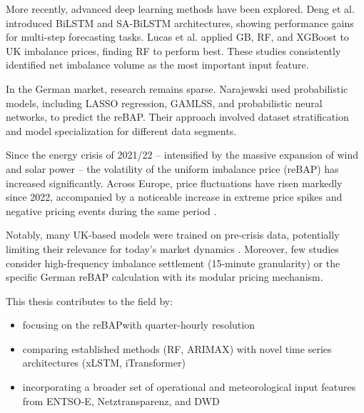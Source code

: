 \documentclass[class=scrbook, crop=false]{standalone}
\begin{document}
More recently, advanced deep learning methods have been explored. Deng et al. \cite{dengSeasonalityDeepLearning2024} introduced BiLSTM and SA-BiLSTM architectures, showing performance gains for multi-step forecasting tasks. Lucas et al. \cite{lucasPriceForecastingBalancing2020} applied \gls{GB}, \gls{RF}, and XGBoost to UK imbalance prices, finding \gls{RF} to perform best. These studies consistently identified net imbalance volume as the most important input feature.

In the German market, research remains sparse. Narajewski \cite{narajewskiProbabilisticForecastingGerman2022} used probabilistic models, including LASSO regression, GAMLSS, and probabilistic neural networks, to predict the reBAP. Their approach involved dataset stratification and model specialization for different data segments.

Since the energy crisis of 2021/22 – intensified by the massive expansion of wind and solar power – the volatility of the uniform imbalance price (reBAP) has increased significantly. Across Europe, price fluctuations have risen markedly since 2022, accompanied by a noticeable increase in extreme price spikes and negative pricing events during the same period \cite{pavlikRenewableEnergyPrice2025}.

Notably, many UK-based models were trained on pre-crisis data, potentially limiting their relevance for today’s market dynamics  \cite{abadieEnergyMarketPrices2021}. Moreover, few studies consider high-frequency imbalance settlement (15-minute granularity) or the specific German reBAP calculation with its modular pricing mechanism.

This thesis contributes to the field by:
\begin{itemize}
\item focusing on the \gls{reBAP}with quarter-hourly resolution
\item comparing established methods (\gls{RF}, \gls{ARIMAX}) with novel time series architectures (xLSTM, iTransformer)
\item incorporating a broader set of operational and meteorological input features from ENTSO-E, Netztransparenz, and DWD
\end{itemize}


\end{document}
